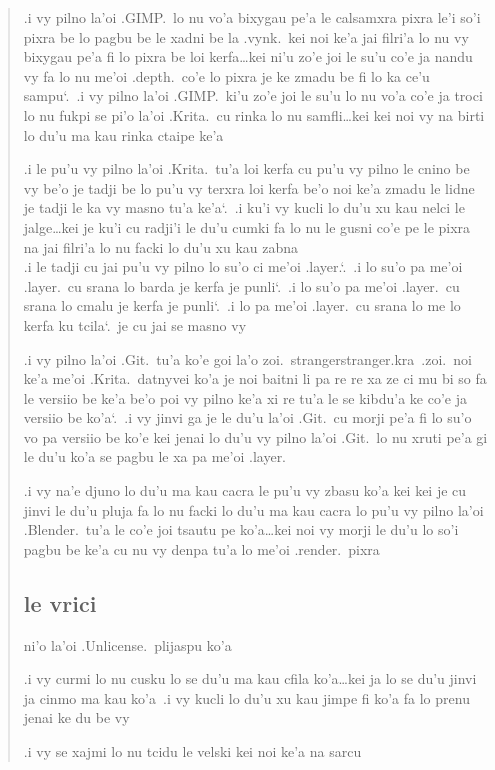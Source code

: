 \documentclass{report}
\newcommand\sds{\spacefactor\sfcode`.\ \space}
\begin{document}
\begin{quote}
	.i vy pilno la'oi .GIMP.\ lo nu vo'a bixygau pe'a le calsamxra pixra le'i so'i pixra be lo pagbu be le xadni be la .vynk.\ kei noi ke'a jai filri'a lo nu vy bixygau pe'a fi lo pixra be loi kerfa\ldots kei ni'u zo'e joi le su'u co'e ja nandu vy fa lo nu me'oi .depth.\ co'e lo pixra je ke zmadu be fi lo ka ce'u sampu\sds  .i vy pilno la'oi .GIMP.\ ki'u zo'e joi le su'u lo nu vo'a co'e ja troci lo nu fukpi se pi'o la'oi .Krita.\ cu rinka lo nu samfli\ldots kei kei noi vy na birti lo du'u ma kau rinka ctaipe ke'a

	.i le pu'u vy pilno la'oi .Krita.\ tu'a loi kerfa cu pu'u vy pilno le cnino be vy be'o je tadji be lo pu'u vy terxra loi kerfa be'o noi ke'a zmadu le lidne je tadji le ka vy masno tu'a ke'a\sds  .i ku'i vy kucli lo du'u xu kau nelci le jalge\ldots kei je ku'i cu radji'i le du'u cumki fa lo nu le gusni co'e pe le pixra na jai filri'a lo nu facki lo du'u xu kau zabna \\
	.i le tadji cu jai pu'u vy pilno lo su'o ci me'oi .layer.\sds  .i lo su'o pa me'oi .layer.\ cu srana lo barda je kerfa je punli\sds  .i lo su'o pa me'oi .layer.\ cu srana lo cmalu je kerfa je punli\sds  .i lo pa me'oi .layer.\ cu srana lo me lo kerfa ku tcila\sds je cu jai se masno vy

	.i vy pilno la'oi .Git.\ tu'a ko'e goi la'o zoi.\ strangerstranger.kra\ .zoi.\ noi ke'a me'oi .Krita.\ datnyvei ko'a je noi baitni li pa re re xa ze ci mu bi so fa le versiio be ke'a be'o poi vy pilno ke'a xi re tu'a le se kibdu'a ke co'e ja versiio be ko'a\sds  .i vy jinvi ga je le du'u la'oi .Git.\ cu morji pe'a fi lo su'o vo pa versiio be ko'e kei jenai lo du'u vy pilno la'oi .Git.\ lo nu xruti pe'a gi le du'u ko'a se pagbu le xa pa me'oi .layer.

	.i vy na'e djuno lo du'u ma kau cacra le pu'u vy zbasu ko'a kei kei je cu jinvi le du'u pluja fa lo nu facki lo du'u ma kau cacra lo pu'u vy pilno la'oi .Blender.\ tu'a le co'e joi tsautu pe ko'a\ldots kei noi vy morji le du'u lo so'i pagbu be ke'a cu nu vy denpa tu'a lo me'oi .render.\ pixra

	\subsection{le vrici}
	 ni'o la'oi .Unlicense.\ plijaspu ko'a

	.i vy curmi lo nu cusku lo se du'u ma kau cfila ko'a\ldots kei ja lo se du'u jinvi ja cinmo ma kau ko'a\  .i vy kucli lo du'u xu kau jimpe fi ko'a fa lo prenu jenai ke du be vy

	.i vy se xajmi lo nu tcidu le velski kei noi ke'a na sarcu
\end{quote}
\end{document}
